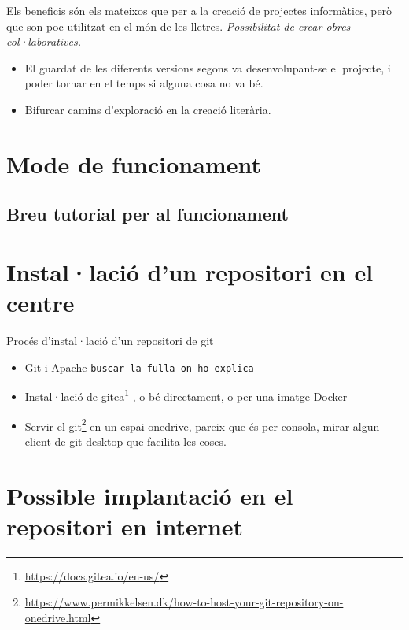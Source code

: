 \documentclass[
  10pt,
]{krantz}
\DeclareRobustCommand{\href}[2]{#2\footnote{\url{#1}}}
\providecommand{\tightlist}{%
  \setlength{\itemsep}{0pt}\setlength{\parskip}{0pt}}
\begin{document}
Els beneficis són els mateixos que per a la creació de projectes informàtics, però que son poc utilitzat en el món de les lletres. \emph{Possibilitat de crear obres col·laboratives.}

\begin{itemize}
\tightlist
\item
  El guardat de les diferents versions segons va desenvolupant-se el projecte, i poder tornar en el temps si alguna cosa no va bé.
\item
  Bifurcar camins d'exploració en la creació literària.
\end{itemize}

\hypertarget{mode-de-funcionament}{%
\section{Mode de funcionament}\label{mode-de-funcionament}}

\hypertarget{breu-tutorial-per-al-funcionament}{%
\subsection{Breu tutorial per al funcionament}\label{breu-tutorial-per-al-funcionament}}

\hypertarget{installaciuxf3-dun-repositori-en-el-centre}{%
\section{Instal·lació d'un repositori en el centre}\label{installaciuxf3-dun-repositori-en-el-centre}}

Procés d'instal·lació d'un repositori de git

\begin{itemize}
\item
  Git i Apache \texttt{buscar\ la\ fulla\ on\ ho\ explica}
\item
  Instal·lació de \href{https://docs.gitea.io/en-us/}{gitea} , o bé directament, o per una imatge Docker
\item
  Servir el \href{https://www.permikkelsen.dk/how-to-host-your-git-repository-on-onedrive.html}{git} en un espai onedrive, pareix que és per consola, mirar algun client de git desktop que facilita les coses.
\end{itemize}

\hypertarget{possible-implantaciuxf3-en-el-repositori-en-internet}{%
\section{Possible implantació en el repositori en internet}\label{possible-implantaciuxf3-en-el-repositori-en-internet}}
\end{document}
